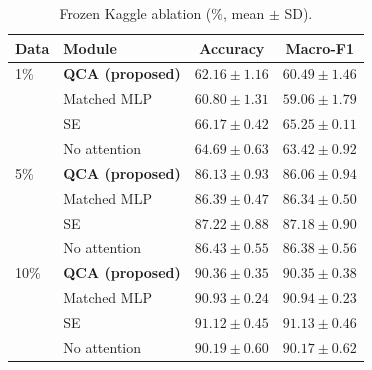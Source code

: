 \begin{table}[!hb]
\centering
\caption{Frozen Kaggle ablation (\%, mean $\pm$ SD).}
\label{tab:low-data}
\small
\begin{tabular}{llcc}
\toprule
Data & Module & Accuracy & Macro-F1 \\
\midrule
1\% & \textbf{QCA (proposed)} & $62.16 \pm 1.16$ & $60.49 \pm 1.46$ \\
 & Matched MLP & $60.80 \pm 1.31$ & $59.06 \pm 1.79$ \\
 & SE & $66.17 \pm 0.42$ & $65.25 \pm 0.11$ \\
 & No attention & $64.69 \pm 0.63$ & $63.42 \pm 0.92$ \\
\midrule
5\% & \textbf{QCA (proposed)} & $86.13 \pm 0.93$ & $86.06 \pm 0.94$ \\
 & Matched MLP & $86.39 \pm 0.47$ & $86.34 \pm 0.50$ \\
 & SE & $87.22 \pm 0.88$ & $87.18 \pm 0.90$ \\
 & No attention & $86.43 \pm 0.55$ & $86.38 \pm 0.56$ \\
\midrule
10\% & \textbf{QCA (proposed)} & $90.36 \pm 0.35$ & $90.35 \pm 0.38$ \\
 & Matched MLP & $90.93 \pm 0.24$ & $90.94 \pm 0.23$ \\
 & SE & $91.12 \pm 0.45$ & $91.13 \pm 0.46$ \\
 & No attention & $90.19 \pm 0.60$ & $90.17 \pm 0.62$ \\
\bottomrule
\end{tabular}
\end{table}
